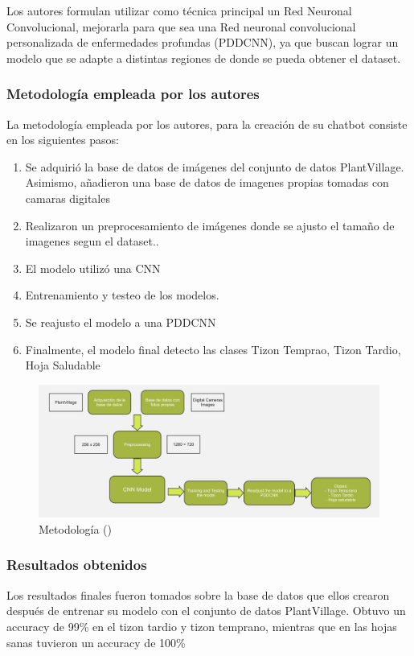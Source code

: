 Los autores formulan utilizar como técnica principal un Red Neuronal Convolucional, mejorarla para que sea una Red neuronal convolucional personalizada de enfermedades profundas (PDDCNN), ya que buscan lograr un modelo que se adapte a distintas regiones de donde se pueda obtener el dataset.


\subsubsection{Metodología empleada por los autores}
La metodología empleada por los autores, para la creación de su chatbot consiste en los siguientes pasos: 
 \begin{enumerate}
	\item Se adquirió la base de datos de imágenes del conjunto de datos PlantVillage. Asimismo, añadieron una base de datos de imagenes propias tomadas con camaras digitales
	\item Realizaron un preprocesamiento de imágenes donde se ajusto el tamaño de imagenes segun el dataset..
	\item El modelo utilizó una CNN
	\item Entrenamiento y testeo de los modelos.
	\item Se reajusto el modelo a una PDDCNN
	\item Finalmente, el modelo final detecto las clases Tizon Temprao, Tizon Tardio, Hoja Saludable
\end{enumerate}
\begin{figure}[H]
	\begin{center}
		\includegraphics[width=1\textwidth]{2/figures/ant6.jpg}
		\caption{Metodología (\cite{antecedente6})}
	\end{center}
\end{figure}

\subsubsection{Resultados obtenidos}
Los resultados finales fueron tomados sobre la base de datos que ellos crearon después de entrenar su modelo con el conjunto de datos PlantVillage. Obtuvo un accuracy de 99\% en el tizon tardio y tizon temprano, mientras que en las hojas sanas tuvieron un accuracy de 100\% 

